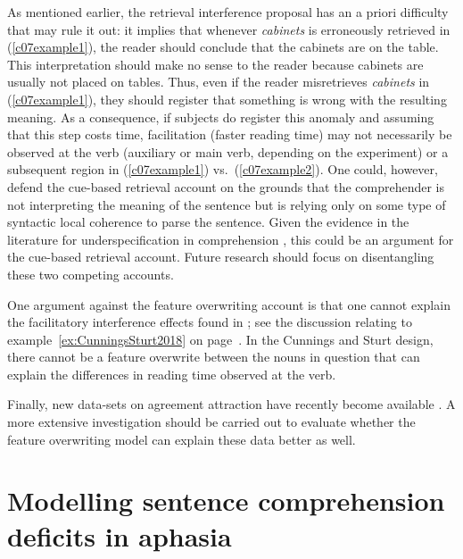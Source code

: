 \documentclass{cambridge7A}\usepackage[]{graphicx}\usepackage[]{color}
\begin{document}
As mentioned earlier, the retrieval interference proposal has an a priori difficulty that may rule it out: it implies that whenever \textit{cabinets} is erroneously retrieved in (\ref{c07example1}), the reader should conclude that the cabinets are on the table. This interpretation should make no sense to the reader because cabinets are usually not placed on tables.  Thus, even if the reader misretrieves \textit{cabinets} in (\ref{c07example1}), they should register that something is wrong with the resulting meaning. As a consequence, if subjects do register this anomaly and assuming that this step costs time, facilitation (faster reading time) may not necessarily be observed at the verb (auxiliary or main verb, depending on the experiment) or a subsequent region in (\ref{c07example1}) vs.\ (\ref{c07example2}). 
One could, however, defend the cue-based retrieval account on the grounds that the comprehender is not interpreting the meaning of the sentence but is relying only on some type of syntactic local coherence \cite{taboretal04} to parse the sentence. Given the evidence in the literature for underspecification in comprehension \citep{SwetsDesmetClifton2008,MalsburgVasishth2013}, this could be an argument for the cue-based retrieval account. Future research should focus on disentangling these two competing accounts.  

One argument against the feature overwriting account is that one cannot explain the facilitatory interference effects found in \cite{CunningsSturt2018}; see the discussion relating to example~\ref{ex:CunningsSturt2018} on page~\pageref{ex:CunningsSturt2018}. In the Cunnings and Sturt design, there cannot be a feature overwrite between the nouns in question that can explain the differences in reading time observed at the verb. 

Finally, new data-sets on agreement attraction have recently become available \citep{ALV2020,JaegerMertzenVanDykeVasishth2019}. A more extensive investigation should be carried out to evaluate whether the feature overwriting model can explain these data better as well.   




\chapter{Modelling sentence comprehension deficits in aphasia} \label{c06}
\end{document}
